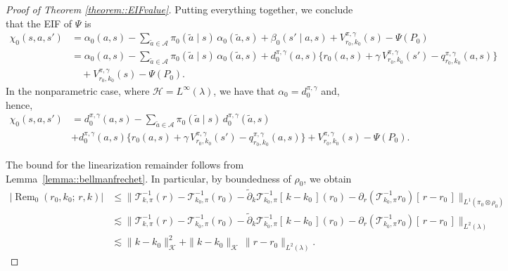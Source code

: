 \documentclass[11pt]{article}
\newcommand{\adk}{\widetilde{\partial}_k}
\theoremstyle{plain}
\begin{document}
\begin{proof}[Proof of Theorem \ref{theorem::EIFvalue}]
Putting everything together, we conclude that the EIF of $\Psi$ is
\begin{align*}
    \chi_0(s,a,s') 
    &= \alpha_0(a,s) 
      - \sum_{\tilde a \in \mathcal{A}} \pi_0(\tilde a \mid s)\,\alpha_0(\tilde a, s) 
      + \beta_0(s' \mid a, s) + V_{r_0, k_0}^{\pi,\gamma}(s) - \Psi(P_0) \\
      &= \alpha_0(a,s) 
      - \sum_{\tilde a \in \mathcal{A}} \pi_0(\tilde a \mid s)\,\alpha_0(\tilde a, s)  + d_0^{\pi,\gamma}(a,s)\Big\{r_0(a,s) + \gamma\,V_{r_0,k_0}^{\pi,\gamma}(s') - q_{r_0,k_0}^{\pi,\gamma}(a,s)  \Big\} \\
      & \quad + V_{r_0, k_0}^{\pi,\gamma}(s) - \Psi(P_0).
\end{align*}
In the nonparametric case, where $\mathcal{H} = L^\infty(\lambda)$, we have that $\alpha_0 = d_0^{\pi,\gamma}$ and, hence,
 \begin{align*}
    \chi_0(s,a,s') 
   &= d_0^{\pi,\gamma}(a,s) 
      - \sum_{\tilde a \in \mathcal{A}} \pi_0(\tilde a \mid s)\,d_0^{\pi,\gamma}(\tilde a, s)  \\
      &+ d_0^{\pi,\gamma}(a,s)\Big\{r_0(a,s) + \gamma\,V_{r_0,k_0}^{\pi,\gamma}(s') - q_{r_0,k_0}^{\pi,\gamma}(a,s)  \Big\}+ V_{r_0, k_0}^{\pi,\gamma}(s) - \Psi(P_0) .
\end{align*}




The bound for the linearization remainder follows from Lemma~\ref{lemma::bellmanfrechet}. In particular, by boundedness of $\rho_0$, we obtain
\begin{align*}
   |\operatorname{Rem}_0(r_0,k_0;\,r,k)| 
   &\leq \|\mathcal T_{k,\pi}^{-1}(r) - \mathcal T_{k_0,\pi}^{-1}(r_0) 
   - \adk \mathcal T_{k_0,\pi}^{-1}[\,k-k_0\,](r_0) 
   - \partial_r (\mathcal T_{k_0,\pi}^{-1} r_0)[\,r-r_0\,]\|_{L^1(\pi_0 \otimes \rho_0)} \\
   &\lesssim \|\mathcal T_{k,\pi}^{-1}(r) - \mathcal T_{k_0,\pi}^{-1}(r_0) 
   - \adk \mathcal T_{k_0,\pi}^{-1}[\,k-k_0\,](r_0) 
   - \partial_r (\mathcal T_{k_0,\pi}^{-1} r_0)[\,r-r_0\,]\|_{L^2(\lambda)} \\ 
   &\lesssim \|k-k_0\|_{\mathcal K}^2 
   + \|k-k_0\|_{\mathcal K}\,\|r-r_0\|_{L^2(\lambda)}.
\end{align*}



 \end{proof}

 


 
\end{document}
